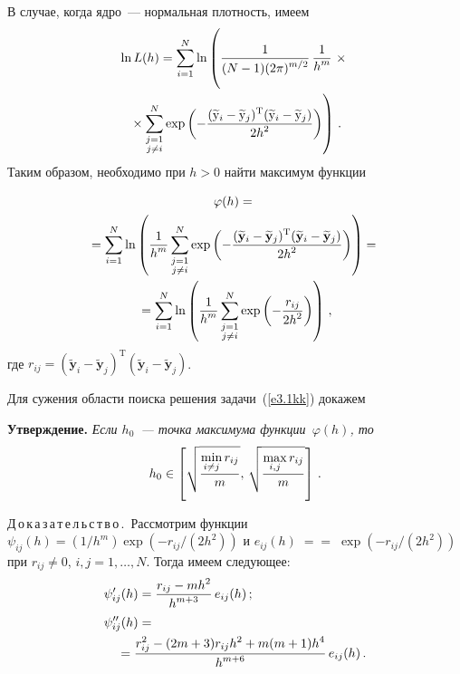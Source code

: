 \begin{multicols}{2}
      В случае, когда ядро~--- нормальная плотность, имеем
      \begin{multline*}
      \ln L(h) =\sum\limits_{i=1}^N \ln \left (
      \vphantom{\sum\limits^N_{\substack{{j=1}\\ {j\not=i}}}} \fr{1}{(N-
1)(2\pi)^{m/2}}\,\fr{1}{h^m}\right.\times{}\\
\left.{}\times\sum\limits^N_{\substack{{j=1}\\ {j\not=i}}}\exp\left( -
\fr{(\widetilde{\mathrm{y}}_i-\widetilde{\mathrm{y}}_j)^{\mathrm{T}}(\widetilde{\mathrm{y}}_i-
\widetilde{\mathrm{y}}_j)}{2h^2}\right)\right)\,.
      \end{multline*}
Таким образом, необходимо при $h>0$   найти максимум функции 

\noindent
\begin{multline*}
\varphi(h) ={}\\
\!{}=\sum\limits_{i=1}^N\ln\left( \displaystyle\frac{\displaystyle 1\mathstrut}{\displaystyle h^m\mathstrut}\sum\limits^N_{\substack{{j=1}\\ {j\not=i}}}\exp 
\left( -\displaystyle\frac{\displaystyle (\widetilde{\mathbf{y}}_i-\widetilde{\mathbf{y}}_j)^{\mathrm{T}}(\widetilde{\mathbf{y}}_i-
\widetilde{\mathbf{y}}_j)\mathstrut}{\displaystyle 2h^2\mathstrut}\right)\right) ={}\\
{}=\sum\limits_{i=1}^N \ln\left(\displaystyle\frac{\displaystyle 1\mathstrut}{\displaystyle h^m\mathstrut}
\sum\limits^N_{\substack{{j=1}\\ {j\not=i}}}
\exp\left(-
\displaystyle\frac{\displaystyle r_{ij}\mathstrut}{\displaystyle 2h^2\mathstrut}\right)\right)\,,
\end{multline*}
где $r_{ij} =(\widetilde{\mathbf{y}}_i-\widetilde{\mathbf{y}}_j)^{\mathrm{T}}(\widetilde{\mathbf{y}}_i-
\widetilde{\mathbf{y}}_j)$.
      
      Для сужения области поиска решения задачи~(\ref{e3.1kk}) докажем
      
      \medskip
      
      \noindent
      \textbf{Утверждение.} \textit{Если $h_0$~--- точка максимума функции~$\varphi(h)$, то} 
      $$
      h_0\in \left [ \sqrt{\displaystyle\frac{\displaystyle \min\limits_{i\not=j} r_{ij}\mathstrut}{\displaystyle m\mathstrut}},\,\sqrt{\displaystyle\frac{\displaystyle \max\limits_{i,j} 
r_{ij}\mathstrut}{\displaystyle m\mathstrut}}\right]\,.
      $$
      
      \medskip
      
      \noindent
      Д\,о\,к\,а\,з\,а\,т\,е\,л\,ь\,с\,т\,в\,о\,.\ Рассмотрим функции $\psi_{ij}(h) =(1/h^m) \exp \left( -
r_{ij}/(2h^2)\right)$ и  $e_{ij}(h)\;=$\linebreak $=\;\exp \left (-r_{ij}/(2h^2)\right)$ при $r_{ij}\not=0$, $i,j=1, \ldots , 
N$. Тогда имеем следующее:
      \begin{align}
      \psi_{ij}^\prime(h) & = \fr{r_{ij}-mh^2}{h^{m+3}}\,e_{ij}(h)\,;\label{e3.2kk}\\
      \psi_{ij}^{\prime\prime}(h) & ={}\notag\\
      &\!\!\!\!\!\!\!\!\!\!{}= \fr{r_{ij}^2-(2m+3)r_{ij} h^2+m(m+1)h^4}{h^{m+6}}\,e_{ij} 
(h)\,.\label{e3.3kk}
      \end{align}
      

\end{multicols}
